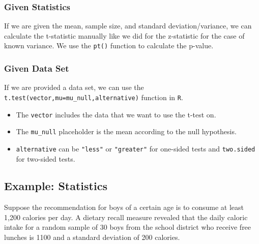 \documentclass[
  letterpaper,
  DIV=11,
  numbers=noendperiod]{scrartcl}
\providecommand{\tightlist}{%
  \setlength{\itemsep}{0pt}\setlength{\parskip}{0pt}}
\begin{document}
\subsubsection{Given Statistics}

If we are given the mean, sample size, and standard deviation/variance,
we can calculate the t-statistic manually like we did for the
z-statistic for the case of known variance. We use the \texttt{pt()}
function to calculate the p-value.

\subsubsection{Given Data Set}

If we are provided a data set, we can use the
\texttt{t.test(vector,mu=mu\_null,alternative)} function in \texttt{R}.

\begin{tcolorbox}[enhanced jigsaw, bottomtitle=1mm, colback=white, opacityback=0, leftrule=.75mm, opacitybacktitle=0.6, coltitle=black, left=2mm, colframe=quarto-callout-important-color-frame, toptitle=1mm, colbacktitle=quarto-callout-important-color!10!white, titlerule=0mm, title=\textcolor{quarto-callout-important-color}{\faExclamation}\hspace{0.5em}{Important}, arc=.35mm, rightrule=.15mm, breakable, bottomrule=.15mm, toprule=.15mm]

\begin{itemize}
\tightlist
\item
  The \texttt{vector} includes the data that we want to use the t-test
  on.
\item
  The \texttt{mu\_null} placeholder is the mean according to the null
  hypothesis.
\item
  \texttt{alternative} can be \texttt{"less"} or \texttt{"greater"} for
  one-sided tests and \texttt{two.sided} for two-sided tests.
\end{itemize}

\end{tcolorbox}

\subsection{Example: Statistics}\label{example-statistics}

Suppose the recommendation for boys of a certain age is to consume at
least 1,200 calories per day. A dietary recall measure revealed that the
daily caloric intake for a random sample of 30 boys from the school
district who receive free lunches is 1100 and a standard deviation of
200 calories.
\end{document}
